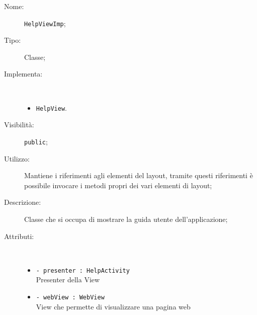 \documentclass[../DefinizioneDiProdotto.tex]{subfiles}
\begin{document}
\begin{description}
	\item[Nome:] \texttt{HelpViewImp};
	\item[Tipo:] Classe;
	\item[Implementa:] \
	\begin{itemize}
		\item \texttt{HelpView}.
		
	\end{itemize}
	\item[Visibilità:] \texttt{public};
	\item[Utilizzo:] Mantiene i riferimenti agli elementi del layout, tramite questi riferimenti è possibile invocare i metodi propri dei vari elementi di layout;
	\item[Descrizione:] Classe che si occupa di mostrare la guida utente dell'applicazione;
	\item[Attributi:] \
	\begin{itemize}
		\item \texttt{- presenter : HelpActivity}\\
		Presenter della View
		
		\item \texttt{- webView : WebView}\\
		View che permette di visualizzare una pagina web
		

\end{itemize}
\end{description}
\end{document}
